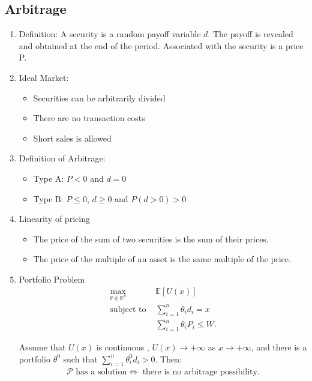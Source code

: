 \documentclass[12pt,twoside]{article}
\begin{document}
\subsection{Arbitrage}
\begin{enumerate}
\item Definition: A security is a random payoff variable $d$. The payoff is revealed and obtained at the end of the period. Associated with the security is a price P.

\item Ideal Market:
	\begin{itemize}
		\item Securities can be arbitrarily divided
		\item There are no transaction costs
		\item Short sales is allowed
	\end{itemize}

\item Definition of Arbitrage:
	\begin{itemize}
	 	\item Type A: $P < 0$ and $d=0$
	 	\item Type B: $P \leq 0$, $d \geq 0$ and $P(d>0)>0$
	\end{itemize}

\item Linearity of pricing
	\begin{itemize}
		\item The price of the sum of two securities is the sum of their prices.
		\item The price of the multiple of an asset is the same multiple of the price. 
	\end{itemize}

\item Portfolio Problem
	\begin{align*}
		\max_{\theta \in \mathbb{R}^n} \text{  }		& \mathbb{E} [U(x)]\\
		\text{subject to }											& \sum_{i=1}^n \theta_id_i = x\\
																			& \sum_{i=1}^n \theta_iP_i \leq W. 
	\end{align*}

	Assume that $U(x)$ is continuous , $U(x) \rightarrow  +\infty$ as $x \rightarrow +\infty$, and there is a portfolio $\theta^0$ such that $\sum_{i=1}^n \theta_i^0 d_i >0$. Then:
	\begin{align*}
		\mathcal{P} \text{ has a solution} \Leftrightarrow \text{ there is no arbitrage possibility.}
	\end{align*}


\end{enumerate}
\end{document}
